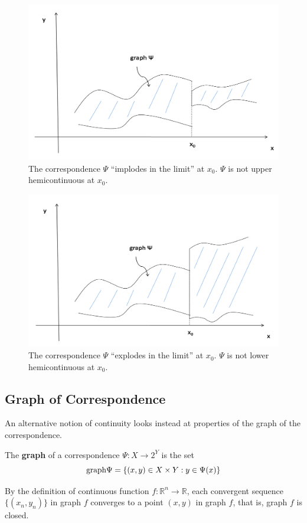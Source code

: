 \documentclass[11pt]{elegantbook}
\begin{document}
\begin{center}\begin{figure}[htbp]
    \centering
    \includegraphics[scale=0.2]{uhc.png}
    \caption{The correspondence $\Psi$ “implodes in the limit” at $x_0$. $\Psi$ is not upper hemicontinuous at $x_0$.}
    \label{}
\end{figure}\end{center}

\begin{center}\begin{figure}[htbp]
    \centering
    \includegraphics[scale=0.2]{lhc.png}
    \caption{The correspondence $\Psi$ “explodes in the limit” at $x_0$. $\Psi$ is not lower hemicontinuous at $x_0$.}
    \label{}
\end{figure}\end{center}

\subsection{Graph of Correspondence}
An alternative notion of continuity looks instead at properties of the graph of the correspondence.
\begin{definition}
    \normalfont
    The \textbf{graph} of a correspondence $\Psi : X \rightarrow 2^Y$ is the set
    $$\textnormal{graph}\Psi=\{(x,y)\in X\times Y:y\in\Psi(x)\}$$
\end{definition}
By the definition of continuous function $f:\mathbb{R}^n \rightarrow \mathbb{R}$,  each convergent sequence $\{(x_n, y_n)\}$ in graph $f$ converges to a point $(x, y)$ in graph $f$, that is, graph $f$ is closed.
\end{document}
